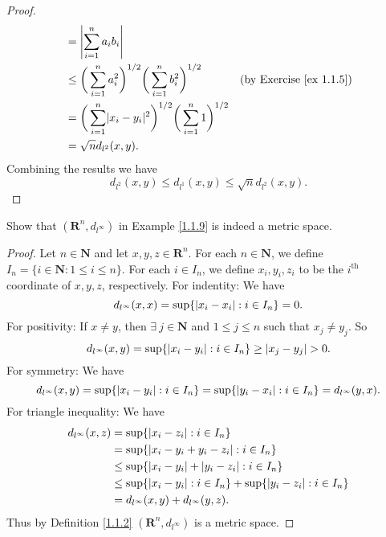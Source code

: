 \begin{proof}
\begin{align*}
                      & = \abs*{\sum_{i = 1}^n a_i b_i}                                                                                                   \\
                      & \leq \bigg(\sum_{i = 1}^n a_i^2\bigg)^{1 / 2} \bigg(\sum_{i = 1}^n b_i^2\bigg)^{1 / 2}      & \text{(by Exercise \ref{ex 1.1.5})} \\
                      & = \bigg(\sum_{i = 1}^n \abs{x_i - y_i}^2\bigg)^{1 / 2} \bigg(\sum_{i = 1}^n 1\bigg)^{1 / 2}                                       \\
                      & = \sqrt{n} d_{l^2}(x, y).
    \end{align*}
    Combining the results we have
    \[
        d_{l^2}(x, y) \leq d_{l^1}(x, y) \leq \sqrt{n} d_{l^2}(x, y).
    \]
\end{proof}

\begin{exercise}\label{ex 1.1.9}
    Show that \((\mathbf{R}^n, d_{l^\infty})\) in Example \ref{1.1.9} is indeed a metric space.
\end{exercise}

\begin{proof}
    Let \(n \in \mathbf{N}\) and let \(x, y, z \in \mathbf{R}^n\).
    For each \(n \in \mathbf{N}\), we define \(I_n = \{i \in \mathbf{N} : 1 \leq i \leq n\}\).
    For each \(i \in I_n\), we define \(x_i, y_i, z_i\) to be the \(i^{\text{th}}\) coordinate of \(x, y, z\), respectively.
    For indentity:
    We have
    \[
        d_{l^\infty}(x, x) = \sup \{\abs*{x_i - x_i} : i \in I_n\} = 0.
    \]
    For positivity:
    If \(x \neq y\), then \(\exists\ j \in \mathbf{N}\) and \(1 \leq j \leq n\) such that \(x_j \neq y_j\).
    So
    \[
        d_{l^\infty}(x, y) = \sup \{\abs*{x_i - y_i} : i \in I_n\} \geq \abs*{x_j - y_j} > 0.
    \]
    For symmetry:
    We have
    \[
        d_{l^\infty}(x, y) = \sup \{\abs*{x_i - y_i} : i \in I_n\} = \sup \{\abs*{y_i - x_i} : i \in I_n\} = d_{l^\infty}(y, x).
    \]
    For triangle inequality:
    We have
    \begin{align*}
        d_{l^\infty}(x, z) & = \sup \{\abs*{x_i - z_i} : i \in I_n\}                                            \\
                           & = \sup \{\abs*{x_i - y_i + y_i - z_i} : i \in I_n\}                                \\
                           & \leq \sup \{\abs*{x_i - y_i} + \abs*{y_i - z_i} : i \in I_n\}                      \\
                           & \leq \sup \{\abs*{x_i - y_i} : i \in I_n\} + \sup \{\abs*{y_i - z_i} : i \in I_n\} \\
                           & = d_{l^\infty}(x, y) + d_{l^\infty}(y, z).
    \end{align*}
    Thus by Definition \ref{1.1.2} \((\mathbf{R}^n, d_{l^\infty})\) is a metric space.
\end{proof}

